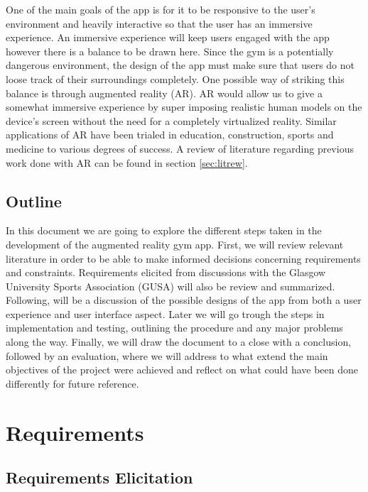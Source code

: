 \documentclass{l4proj}
\begin{document}
One of the main goals of the app is for it to be responsive to the user's environment and heavily interactive so that the user has an immersive experience. An immersive experience will keep users engaged with the app however there is a balance to be drawn here. Since the gym is a potentially dangerous environment, the design of the app must make sure that users do not loose track of their surroundings completely. One possible way of striking this balance is through augmented reality (AR). AR would allow us to give a somewhat immersive experience by super imposing realistic human models on the device's screen without the need for a completely virtualized reality. Similar applications of AR have been trialed in education, construction, sports and medicine to various degrees of success. A review of literature regarding previous work done with AR can be found in section \ref{sec:litrew}.

\section{Outline}
In this document we are going to explore the different steps taken in the development of the augmented reality gym app. First, we will review relevant literature in order to be able to make informed decisions concerning requirements and constraints. Requirements elicited from discussions with the Glasgow University Sports Association (GUSA) will also be review and summarized. Following, will be a discussion of the possible designs of the app from both a user experience and user interface aspect. Later we will go trough the steps in implementation and testing, outlining the procedure and any major problems along the way. Finally, we will draw the document to a close with a conclusion, followed by an evaluation, where we will address to what extend the main objectives of the project were achieved and reflect on what could have been done differently for future reference. 

\chapter{Requirements}

\section{Requirements Elicitation}
\end{document}
